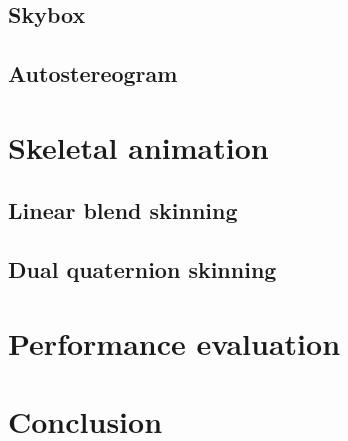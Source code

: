 \documentclass[12pt, a4paper]{article}
\begin{document}
\subsection{Skybox}

\subsection{Autostereogram}

\section{Skeletal animation}

\subsection{Linear blend skinning}

\subsection{Dual quaternion skinning}

\section{Performance evaluation}

\section{Conclusion}
\end{document}
